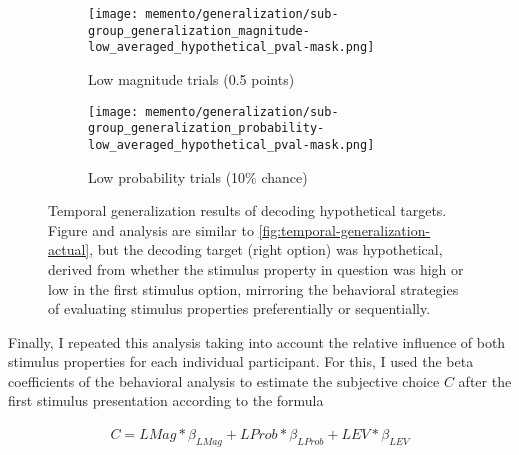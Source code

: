 \begin{figure}[H]
	\begin{subfigure}[c]{0.5\textwidth}
		\texttt{[image: memento/generalization/sub-group\_generalization\_magnitude-low\_averaged\_hypothetical\_pval-mask.png]}
		\caption{Low magnitude trials (0.5 points)}
		\label{fig:generalization-mag-low-hypothetical}
	\end{subfigure}
	\begin{subfigure}[c]{0.5\textwidth}
		\texttt{[image: memento/generalization/sub-group\_generalization\_probability-low\_averaged\_hypothetical\_pval-mask.png]}
		\caption{Low probability trials (10\% chance)}
		\label{fig:generalization-prob-low-hypothetical}
	\end{subfigure}
	\caption[Temporal generalization: Hypothetical choice]{Temporal generalization results of decoding hypothetical targets. Figure and analysis are similar to \ref{fig:temporal-generalization-actual}, but the decoding target (right option) was hypothetical, derived from whether the stimulus property in question was high or low in the first stimulus option, mirroring the behavioral strategies of evaluating stimulus properties preferentially or sequentially.}
	\label{fig:temporal-generalization-hypothetical}
\end{figure}

Finally, I repeated this analysis taking into account the relative influence of both stimulus properties for each individual participant.
For this, I used the beta coefficients of the behavioral analysis to estimate the subjective choice $C$ after the first stimulus presentation according to the formula

\begin{equation}
	\begin{aligned}
		C = LMag * \beta_{LMag} + LProb * \beta_{LProb} + LEV * \beta_{LEV}
	\end{aligned}
\end{equation}

